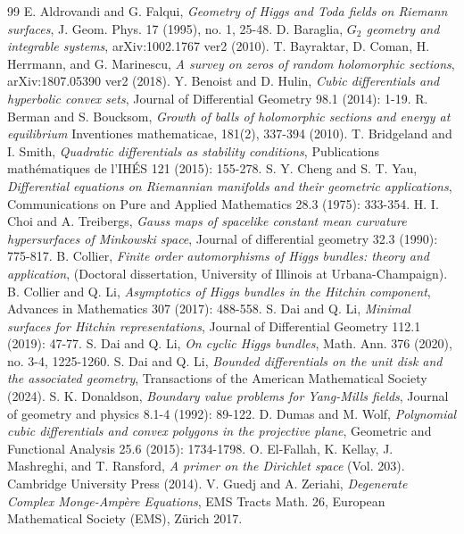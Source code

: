 \documentclass[12pt]{article}
\theoremstyle{definition}
\begin{document}
\begin{thebibliography}{99}
E. Aldrovandi and G. Falqui, {\it Geometry of Higgs and Toda fields on Riemann surfaces}, J. Geom. Phys. 17 (1995), no. 1, 25-48.
 D. Baraglia, {\it $G_2$ geometry and integrable systems}, arXiv:1002.1767 ver2 (2010).
 T. Bayraktar, D. Coman, H. Herrmann, and G. Marinescu, {\it A survey on zeros of random holomorphic sections}, arXiv:1807.05390 ver2 (2018).
 Y. Benoist and D. Hulin, {\it Cubic differentials and hyperbolic convex sets}, Journal of Differential Geometry 98.1 (2014): 1-19.
 R. Berman and S. Boucksom, {\it Growth of balls of holomorphic sections and energy at equilibrium} Inventiones mathematicae, 181(2), 337-394 (2010).
 T. Bridgeland and I. Smith, {\it Quadratic differentials as stability conditions}, Publications math\'ematiques de l'IH\'ES 121 (2015): 155-278.
 S. Y. Cheng and S. T. Yau, {\it Differential equations on Riemannian manifolds and their geometric applications}, Communications on Pure and Applied Mathematics 28.3 (1975): 333-354.
 H. I. Choi and A. Treibergs, {\it Gauss maps of spacelike constant mean curvature hypersurfaces of Minkowski space}, Journal of differential geometry 32.3 (1990): 775-817.
 B. Collier, {\it Finite order automorphisms of Higgs bundles: theory and application}, (Doctoral dissertation, University of Illinois at Urbana-Champaign).
 B. Collier and Q. Li, {\it Asymptotics of Higgs bundles in the Hitchin component}, Advances in Mathematics 307 (2017): 488-558.
 S. Dai and Q. Li, {\it Minimal surfaces for Hitchin representations}, Journal of Differential Geometry 112.1 (2019): 47-77.
 S. Dai and Q. Li, {\it On cyclic Higgs bundles}, Math. Ann. 376 (2020), no. 3-4, 1225-1260.
 S. Dai and Q. Li, {\it Bounded differentials on the unit disk and the associated geometry}, Transactions of the American Mathematical Society (2024).
 S. K. Donaldson, {\it Boundary value problems for Yang-Mills fields}, Journal of geometry and physics 8.1-4 (1992): 89-122.
 D. Dumas and M. Wolf, {\it Polynomial cubic differentials and convex polygons in the projective plane}, Geometric and Functional Analysis 25.6 (2015): 1734-1798.
 O. El-Fallah, K. Kellay, J. Mashreghi, and T. Ransford, {\it A primer on the Dirichlet space} (Vol. 203). Cambridge University Press (2014).
 V. Guedj and A. Zeriahi, {\it Degenerate Complex Monge-Amp\`ere Equations}, EMS Tracts Math. 26, European Mathematical Society (EMS), Z\"urich 2017.

\end{thebibliography}
\end{document}
